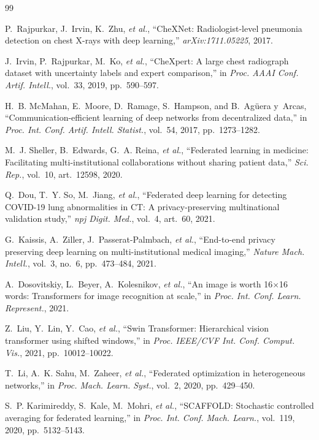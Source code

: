 \documentclass[letterpaper, conference]{IEEEtran}
\begin{document}
\balance
\begin{thebibliography}{99}

P.~Rajpurkar, J.~Irvin, K.~Zhu, \emph{et al.}, ``CheXNet: Radiologist-level
pneumonia detection on chest X-rays with deep learning,'' \emph{arXiv:1711.05225},
2017.

J.~Irvin, P.~Rajpurkar, M.~Ko, \emph{et al.}, ``CheXpert: A large chest radiograph
dataset with uncertainty labels and expert comparison,'' in \emph{Proc. AAAI Conf.
Artif. Intell.}, vol.~33, 2019, pp.~590--597.

H.~B. McMahan, E.~Moore, D.~Ramage, S.~Hampson, and B.~Ag{\"u}era y~Arcas,
``Communication-efficient learning of deep networks from decentralized data,'' in
\emph{Proc. Int. Conf. Artif. Intell. Statist.}, vol.~54, 2017, pp.~1273--1282.

M.~J. Sheller, B.~Edwards, G.~A. Reina, \emph{et al.}, ``Federated learning in
medicine: Facilitating multi-institutional collaborations without sharing patient
data,'' \emph{Sci. Rep.}, vol.~10, art.~12598, 2020.

Q.~Dou, T.~Y. So, M.~Jiang, \emph{et al.}, ``Federated deep learning for detecting
COVID-19 lung abnormalities in CT: A privacy-preserving multinational validation
study,'' \emph{npj Digit. Med.}, vol.~4, art.~60, 2021.

G.~Kaissis, A.~Ziller, J.~Passerat-Palmbach, \emph{et al.}, ``End-to-end privacy
preserving deep learning on multi-institutional medical imaging,'' \emph{Nature
Mach. Intell.}, vol.~3, no.~6, pp.~473--484, 2021.

A.~Dosovitskiy, L.~Beyer, A.~Kolesnikov, \emph{et al.}, ``An image is worth
16$\times$16 words: Transformers for image recognition at scale,'' in \emph{Proc.
Int. Conf. Learn. Represent.}, 2021.

Z.~Liu, Y.~Lin, Y.~Cao, \emph{et al.}, ``Swin Transformer: Hierarchical vision
transformer using shifted windows,'' in \emph{Proc. IEEE/CVF Int. Conf. Comput.
Vis.}, 2021, pp.~10012--10022.

T.~Li, A.~K. Sahu, M.~Zaheer, \emph{et al.}, ``Federated optimization in
heterogeneous networks,'' in \emph{Proc. Mach. Learn. Syst.}, vol.~2, 2020,
pp.~429--450.

S.~P. Karimireddy, S.~Kale, M.~Mohri, \emph{et al.}, ``SCAFFOLD: Stochastic
controlled averaging for federated learning,'' in \emph{Proc. Int. Conf. Mach.
Learn.}, vol.~119, 2020, pp.~5132--5143.


\end{thebibliography}
\end{document}
